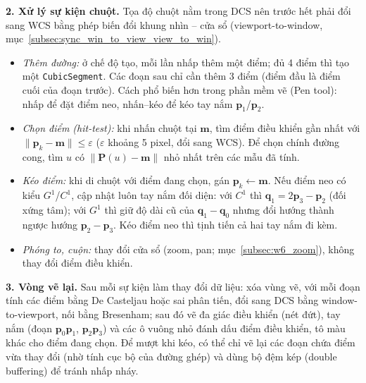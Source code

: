 \textbf{2. Xử lý sự kiện chuột.} Tọa độ chuột nằm trong DCS nên trước hết phải đổi sang WCS bằng phép biến đổi khung nhìn -- cửa sổ (viewport-to-window, mục~\ref{subsec:sync_win_to_view_view_to_win}).
\begin{itemize}
    \item \emph{Thêm đường:} ở chế độ tạo, mỗi lần nhấp thêm một điểm; đủ 4 điểm thì tạo một \texttt{CubicSegment}. Các đoạn sau chỉ cần thêm 3 điểm (điểm đầu là điểm cuối của đoạn trước). Cách phổ biến hơn trong phần mềm vẽ (Pen tool): nhấp để đặt điểm neo, nhấn--kéo để kéo tay nắm $\mathbf{p}_1$/$\mathbf{p}_2$.
    \item \emph{Chọn điểm (hit-test):} khi nhấn chuột tại $\mathbf{m}$, tìm điểm điều khiển gần nhất với $\|\mathbf{p}_k - \mathbf{m}\| \le \varepsilon$ ($\varepsilon$ khoảng 5 pixel, đổi sang WCS). Để chọn chính đường cong, tìm $u$ có $\|\mathbf{P}(u) - \mathbf{m}\|$ nhỏ nhất trên các mẫu đã tính.
    \item \emph{Kéo điểm:} khi di chuột với điểm đang chọn, gán $\mathbf{p}_k \leftarrow \mathbf{m}$. Nếu điểm neo có kiểu $G^1$/$C^1$, cập nhật luôn tay nắm đối diện: với $C^1$ thì $\mathbf{q}_1 = 2\mathbf{p}_3 - \mathbf{p}_2$ (đối xứng tâm); với $G^1$ thì giữ độ dài cũ của $\mathbf{q}_1 - \mathbf{q}_0$ nhưng đổi hướng thành ngược hướng $\mathbf{p}_2 - \mathbf{p}_3$. Kéo điểm neo thì tịnh tiến cả hai tay nắm đi kèm.
    \item \emph{Phóng to, cuộn:} thay đổi cửa sổ (zoom, pan; mục~\ref{subsec:w6_zoom}), không thay đổi điểm điều khiển.
\end{itemize}

\textbf{3. Vòng vẽ lại.} Sau mỗi sự kiện làm thay đổi dữ liệu: xóa vùng vẽ, với mỗi đoạn tính các điểm bằng De Casteljau hoặc sai phân tiến, đổi sang DCS bằng window-to-viewport, nối bằng Bresenham; sau đó vẽ đa giác điều khiển (nét đứt), tay nắm (đoạn $\mathbf{p}_0\mathbf{p}_1$, $\mathbf{p}_2\mathbf{p}_3$) và các ô vuông nhỏ đánh dấu điểm điều khiển, tô màu khác cho điểm đang chọn. Để mượt khi kéo, có thể chỉ vẽ lại các đoạn chứa điểm vừa thay đổi (nhờ tính cục bộ của đường ghép) và dùng bộ đệm kép (double buffering) để tránh nhấp nháy.

